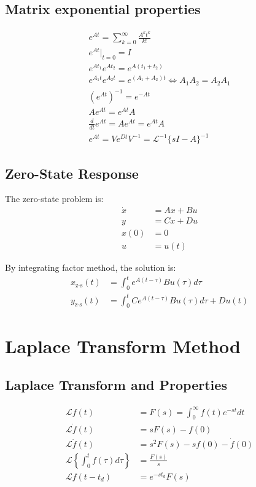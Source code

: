 \documentclass[letterpaper,12pt]{article}
\begin{document}
\subsection{Matrix exponential properties}
\begin{gather*}
    e^{At} = \sum_{k=0}^{\infty} \frac{A^kt^k}{k!} \\
    e^{At}|_{t=0} = I \\
    e^{At_1}e^{At_2} = e^{A(t_1 + t_2)} \\
    e^{A_1t}e^{A_2t} = e^{(A_1 + A_2)t} \iff A_1A_2 = A_2A_1 \\
    (e^{At})^{-1} = e^{-At} \\
    Ae^{At} = e^{At}A \\
    \frac{d}{dt}e^{At} = Ae^{At} = e^{At}A \\
    e^{At} = Ve^{Dt}V^{-1}  = \mathcal{L}^{-1}\{sI - A\}^{-1}
\end{gather*}

\subsection{Zero-State Response}
The zero-state problem is:
\begin{align*}
    \dot{x} &= Ax + Bu \\
    y &= Cx + Du \\
    x(0) &= 0 \\
    u &= u(t)
\end{align*}

By integrating factor method, the solution is:
\begin{align*}
    x_{\text{z-s}}(t) &= \int_{0}^{t} e^{A(t-\tau)}Bu(\tau) d\tau \\
    y_{\text{z-s}}(t) &= \int_{0}^{t} Ce^{A(t-\tau)}Bu(\tau) d\tau + Du(t)
\end{align*}

\section{Laplace Transform Method}
\subsection{Laplace Transform and Properties}
\begin{align*}
    \mathcal{L}{f(t)} &= F(s) = \int_{0}^{\infty} f(t)e^{-st} dt \\
    \mathcal{L}{\dot{f}(t)} &= sF(s) - f(0) \\
    \mathcal{L}{\ddot{f}(t)} &= s^2F(s) - sf(0) - \dot{f}(0) \\
    \mathcal{L}\left\{\int_{0}^{t} f(\tau) d\tau\right\} &= \frac{F(s)}{s} \\
    \mathcal{L}{f(t-t_d)} &= e^{-st_d}F(s) \\
\end{align*}
\end{document}
